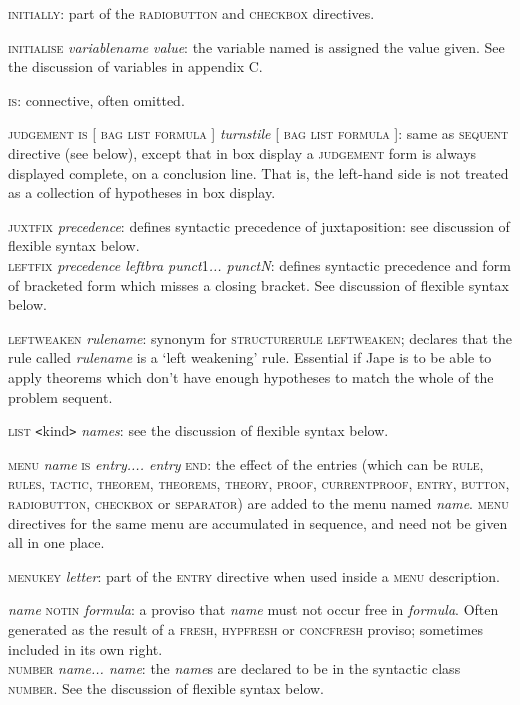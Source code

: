 \documentclass[11pt]{book}
\begin{document}
\textsc{initially}: part of the \textsc{radiobutton} and \textsc{checkbox} directives.


\textsc{initialise} \textit{variablename} \textit{value}: the variable named is assigned the value given. See the discussion of variables in appendix C.


\textsc{is}: connective, often omitted.


\textsc{judgement is} [ \textsc{bag} {\textbar} \textsc{list} {\textbar} \textsc{formula} ] \textit{turnstile} [ \textsc{bag} {\textbar} \textsc{list} {\textbar} \textsc{formula} ]: same as \textsc{sequent} directive (see below), except that in box display a \textsc{judgement} form is always displayed complete, on a conclusion line. That is, the left-hand side is not treated as a collection of hypotheses in box display.


\textsc{juxtfix} \textit{precedence}: defines syntactic precedence of juxtaposition: see discussion of flexible syntax below.\\
\textsc{leftfix} \textit{precedence leftbra punct}1\textit{... punctN}: defines syntactic precedence and form of bracketed form which misses a closing bracket. See discussion of flexible syntax below.


\textsc{leftweaken} \textit{rulename}: synonym for \textsc{structurerule} \textsc{leftweaken}; declares that the rule called \textit{rulename} is a `left weakening' rule. Essential if Jape is to be able to apply theorems which don't have enough hypotheses to match the whole of the problem sequent.


\textsc{list \texttt{<}}kind\textsc{\texttt{>}} \textit{names}: see the discussion of flexible syntax below.


\textsc{menu} \textit{name} \textsc{is} \textit{entry.... entry} \textsc{end}: the effect of the entries (which can be \textsc{rule, rules, tactic, theorem, theorems, theory, proof, currentproof, entry, button, radiobutton, checkbox} or \textsc{separator)} are added to the menu named \textit{name}. \textsc{menu} directives for the same menu are accumulated in sequence, and need not be given all in one place.


\textsc{menukey} \textit{letter}: part of the \textsc{entry} directive when used inside a \textsc{menu} description.


\textit{name} \textsc{notin} \textit{formula}: a proviso that \textit{name} must not occur free in \textit{formula}. Often generated as the result of a \textsc{fresh, hypfresh} or \textsc{concfresh} proviso; sometimes included in its own right.\\
\textsc{number} \textit{name... name}: the \textit{name}s are declared to be in the syntactic class \textsc{number}. See the discussion of flexible syntax below.
\end{document}
